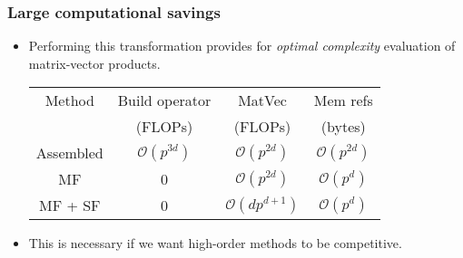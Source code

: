 \documentclass[presentation]{beamer}
\begin{document}
\begin{frame}
  \frametitle{Large computational savings}
  \begin{itemize}
  \item Performing this transformation provides for \emph{optimal
      complexity} evaluation of matrix-vector products.

    \begin{center}
      \begin{tabular}{c|c|c|c}
        Method    & Build operator        & MatVec                  & Mem refs
        \\
                  & (FLOPs)               & (FLOPs)                 & (bytes)               \\
        \hline
        Assembled & $\mathcal{O}(p^{3d})$ & $\mathcal{O}(p^{2d})$   & $\mathcal{O}(p^{2d})$ \\
        MF        & 0                     & $\mathcal{O}(p^{2d})$   & $\mathcal{O}(p^d)$    \\
        MF + SF   & 0                     & $\mathcal{O}(dp^{d+1})$ & $\mathcal{O}(p^d)$
      \end{tabular}
    \end{center}
    
  \item This is necessary if we want high-order methods to be competitive.
  \end{itemize}
  
\end{frame}
\end{document}
